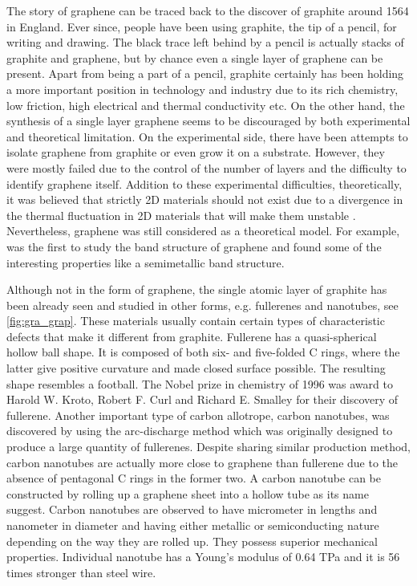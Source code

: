 The story of graphene can be traced back to the discover of graphite around 1564 in England\cite{petroski1990pencil}. Ever since, people have been using graphite, the tip of a pencil, for writing and drawing. The black trace left behind by a pencil is actually stacks of graphite and graphene, but by chance even a single layer of graphene can be present.  Apart from being a part of a pencil, graphite certainly has been holding a more important position in technology and industry due to its rich chemistry, low friction, high electrical and thermal conductivity etc. On the other hand, the synthesis of a single layer graphene seems to be discouraged by both experimental and theoretical limitation. On the experimental side, there have been attempts\cite{Krishnan1997,Ohashi1997,Dresselhaus2002,Shioyama2001} to isolate graphene from graphite or even grow it on a substrate. However, they were mostly failed due to the control of the number of layers and the difficulty to identify graphene itself.  Addition to these experimental difficulties, theoretically, it was believed that strictly 2D materials should not exist due to a divergence in the thermal fluctuation in 2D materials that will make them unstable \cite{Peierls1935,Landau1937,Mermin1968}. Nevertheless, graphene was still considered as a theoretical model. For example, \citet{Wallace1947} was the first to study the band structure of graphene \cite{CastroNeto2009} and found some of the interesting properties like a semimetallic band structure. 

Although not in the form of graphene, the single atomic layer of graphite has been already seen and studied in other forms, e.g. fullerenes and nanotubes, see \autoref{fig:gra_grap}. These materials usually contain certain types of characteristic defects that make it different from graphite.  Fullerene has a quasi-spherical hollow ball shape. It is composed of both six- and five-folded C rings, where the latter give positive curvature and made closed surface possible. The resulting shape resembles a football\cite{Kroto1985,Lamb1990}. The Nobel prize in chemistry of 1996 was award to Harold W. Kroto, Robert F. Curl and Richard E. Smalley for their discovery of fullerene. Another important type of carbon allotrope, carbon nanotubes\cite{Iijima1993}, was discovered by using the arc-discharge method\cite{Lamb1990} which was originally designed to produce a large quantity of fullerenes. Despite sharing similar production method, carbon nanotubes are actually more close to graphene than fullerene due to the absence of pentagonal C rings in the former two. A carbon nanotube can be constructed by rolling up a graphene sheet into a hollow tube as its name suggest. Carbon nanotubes are observed to have micrometer in lengths and nanometer in diameter and having either metallic or semiconducting nature depending on the way they are rolled up. They possess superior mechanical properties. Individual nanotube has a Young's modulus of 0.64 TPa and it is 56 times stronger than steel wire\cite{Baughman787}.

